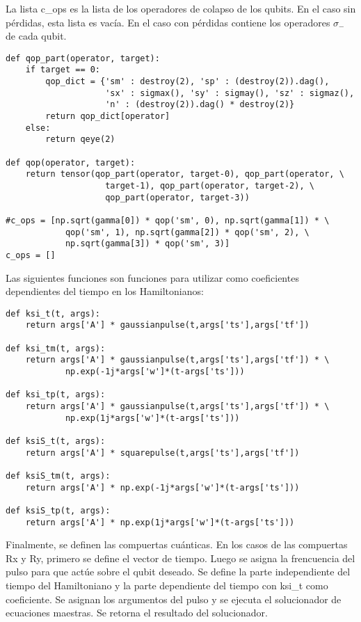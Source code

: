 La lista c\_ops es la lista de los operadores de colapso de los qubits. En el caso sin pérdidas, esta lista es vacía. En el caso con pérdidas contiene los operadores $\sigma_-$ de cada qubit.

\begin{verbatim}
def qop_part(operator, target):
    if target == 0:
        qop_dict = {'sm' : destroy(2), 'sp' : (destroy(2)).dag(), 
                    'sx' : sigmax(), 'sy' : sigmay(), 'sz' : sigmaz(),
                    'n' : (destroy(2)).dag() * destroy(2)}
        return qop_dict[operator]
    else:
        return qeye(2)

def qop(operator, target):
    return tensor(qop_part(operator, target-0), qop_part(operator, \
                    target-1), qop_part(operator, target-2), \
                    qop_part(operator, target-3))
    
#c_ops = [np.sqrt(gamma[0]) * qop('sm', 0), np.sqrt(gamma[1]) * \
            qop('sm', 1), np.sqrt(gamma[2]) * qop('sm', 2), \
            np.sqrt(gamma[3]) * qop('sm', 3)]
c_ops = []
\end{verbatim}

Las siguientes funciones son funciones para utilizar como coeficientes dependientes del tiempo en los Hamiltonianos:

\begin{verbatim}
def ksi_t(t, args):
    return args['A'] * gaussianpulse(t,args['ts'],args['tf'])

def ksi_tm(t, args):
    return args['A'] * gaussianpulse(t,args['ts'],args['tf']) * \
            np.exp(-1j*args['w']*(t-args['ts']))

def ksi_tp(t, args):
    return args['A'] * gaussianpulse(t,args['ts'],args['tf']) * \
            np.exp(1j*args['w']*(t-args['ts']))

def ksiS_t(t, args):
    return args['A'] * squarepulse(t,args['ts'],args['tf'])

def ksiS_tm(t, args):
    return args['A'] * np.exp(-1j*args['w']*(t-args['ts']))

def ksiS_tp(t, args):
    return args['A'] * np.exp(1j*args['w']*(t-args['ts']))
\end{verbatim}

Finalmente, se definen las compuertas cuánticas. En los casos de las compuertas Rx y Ry, primero se define el vector de tiempo. Luego se asigna la frencuencia del pulso para que actúe sobre el qubit deseado. Se define la parte independiente del tiempo del Hamiltoniano y la parte dependiente del tiempo con ksi\_t como coeficiente. Se asignan los argumentos del pulso y se ejecuta el solucionador de ecuaciones maestras. Se retorna el resultado del solucionador.

